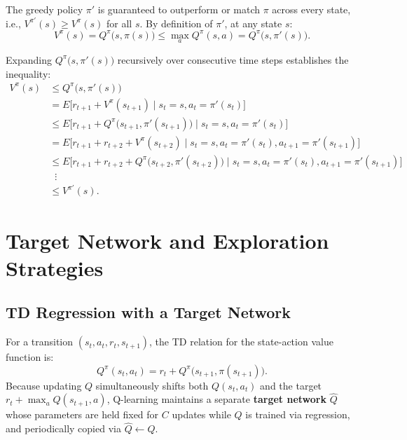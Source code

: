 \documentclass[11pt, a4paper]{article}
\begin{document}
The greedy policy $\pi'$ is guaranteed to outperform or match $\pi$ across every state, i.e., $V^{\pi'}(s) \ge V^\pi(s)$ for all $s$. By definition of $\pi'$, at any state $s$:
\begin{equation}\label{eq:q-greedy-improvement}
    V^\pi(s) = Q^\pi\big(s, \pi(s)\big) \le \max_a Q^\pi(s, a) = Q^\pi\big(s, \pi'(s)\big).
\end{equation}

Expanding $Q^\pi\big(s, \pi'(s)\big)$ recursively over consecutive time steps establishes the inequality:
\begin{align}
    V^\pi(s) &\le Q^\pi\big(s, \pi'(s)\big) \nonumber \\
    &= E\Big[r_{t+1} + V^\pi(s_{t+1}) \;\Big|\; s_t = s, a_t = \pi'(s_t)\Big] \nonumber \\
    &\le E\Big[r_{t+1} + Q^\pi\big(s_{t+1}, \pi'(s_{t+1})\big) \;\Big|\; s_t = s, a_t = \pi'(s_t)\Big] \nonumber \\
    &= E\Big[r_{t+1} + r_{t+2} + V^\pi(s_{t+2}) \;\Big|\; s_t = s, a_t = \pi'(s_t), a_{t+1} = \pi'(s_{t+1})\Big] \nonumber \\
    &\le E\Big[r_{t+1} + r_{t+2} + Q^\pi\big(s_{t+2}, \pi'(s_{t+2})\big) \;\Big|\; s_t = s, a_t = \pi'(s_t), a_{t+1} = \pi'(s_{t+1})\Big] \nonumber \\
    &\;\;\vdots \nonumber \\
    &\le V^{\pi'}(s).\label{eq:q-policy-improvement-proof}
\end{align}

\section{Target Network and Exploration Strategies}

\subsection*{TD Regression with a Target Network}

For a transition $(s_t, a_t, r_t, s_{t+1})$, the TD relation for the state-action value function is:
\begin{equation}\label{eq:q-q-value-relation}
    Q^\pi(s_t, a_t) = r_t + Q^\pi\big(s_{t+1}, \pi(s_{t+1})\big).
\end{equation}
Because updating $Q$ simultaneously shifts both $Q(s_t, a_t)$ and the target $r_t + \max_a Q(s_{t+1}, a)$, Q-learning maintains a separate \textbf{target network} $\hat{Q}$ whose parameters are held fixed for $C$ updates while $Q$ is trained via regression, and periodically copied via $\hat{Q} \leftarrow Q$.
\end{document}
